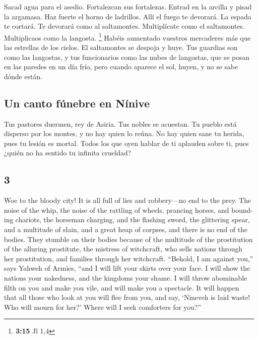 \begin{paracol}{2}
 Sacad agua para el asedio. Fortalezcan sus fortalezas.
Entrad en la arcilla y pisad la argamasa. Haz fuerte el horno de
ladrillos.  Allí el fuego te devorará. La espada te
cortará. Te devorará como al saltamontes. Multiplícate como el
saltamontes. Multiplicaos como la langosta. \footnote{\textbf{3:15} Jl
  1,4}  Habéis aumentado vuestros mercaderes más que las
estrellas de los cielos. El saltamontes se despoja y huye.
 Tus guardias son como las langostas, y tus funcionarios
como las nubes de langostas, que se posan en las paredes en un día frío,
pero cuando aparece el sol, huyen, y no se sabe dónde están.

\hypertarget{un-canto-fuxfanebre-en-nuxednive}{%
\subsection{Un canto fúnebre en
Nínive}\label{un-canto-fuxfanebre-en-nuxednive}}

 Tus pastores duermen, rey de Asiria. Tus nobles se
acuestan. Tu pueblo está disperso por los montes, y no hay quien lo
reúna.  No hay quien sane tu herida, pues tu lesión es
mortal. Todos los que oyen hablar de ti aplauden sobre ti, pues ¿quién
no ha sentido tu infinita crueldad? \switchcolumn
\begin{otherlanguage}{english}

\hypertarget{section-5}{%
\section{3}\label{section-5}}

 Woe to the bloody city! It is all full of lies and
robbery---no end to the prey.  The noise of the whip, the
noise of the rattling of wheels, prancing horses, and bounding chariots,
 the horseman charging, and the flashing sword, the
glittering spear, and a multitude of slain, and a great heap of corpses,
and there is no end of the bodies. They stumble on their bodies
 because of the multitude of the prostitution of the
alluring prostitute, the mistress of witchcraft, who sells nations
through her prostitution, and families through her witchcraft.
 ``Behold, I am against you,'' says Yahweh of Armies,
``and I will lift your skirts over your face. I will show the nations
your nakedness, and the kingdoms your shame.  I will throw
abominable filth on you and make you vile, and will make you a
spectacle.  It will happen that all those who look at you
will flee from you, and say, `Nineveh is laid waste! Who will mourn for
her?' Where will I seek comforters for you?''


\end{otherlanguage}
\end{paracol}
